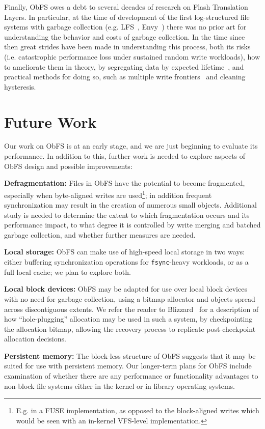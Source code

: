 \documentclass[sigconf,anonymous,10pt]{acmart}
\begin{document}
\begin{CCSXML}
Finally, ObFS owes a debt to several decades of research on Flash Translation Layers.
In particular, at the time of development of the first log-structured file systems with garbage collection (e.g. LFS~\cite{rosenblum_design_1991}, Envy~\cite{wu_envy_1994}) there was no prior art for understanding the behavior and costs of garbage collection.
In the time since then great strides have been made in understanding this process, both its risks (i.e. catastrophic performance loss under sustained random write workloads), how to ameliorate them in theory, by segregating data by expected lifetime~\cite{lee_last_2008}, and practical methods for doing so, such as multiple write frontiers~\cite{lee_f2fs_2015} and cleaning hysteresis.

\section{Future Work}
Our work on ObFS is at an early stage, and we are just beginning to evaluate its performance.
In addition to this, further work is needed to explore aspects of ObFS design and possible improvements:

\textbf{Defragmentation:} Files in ObFS have the potential to become  fragmented, especially when byte-aligned writes are used\footnote{E.g. in a FUSE implementation, as opposed to the block-aligned writes which would be seen with an in-kernel VFS-level implementation.}; in addition frequent synchronization may result in the creation of numerous small objects.
Additional study is needed to determine the extent to which fragmentation occurs and its performance impact, to what degree it is controlled by write merging and batched garbage collection, and whether further measures are needed.

\textbf{Local storage:} ObFS can make use of high-speed local storage in two ways: either buffering synchronization operations for \texttt{fsync}-heavy workloads, or as a full local cache; we plan to explore both.

\textbf{Local block devices:} ObFS may be adapted for use over local block devices with no need for garbage collection, using a bitmap allocator and objects spread across discontiguous extents.
We refer the reader to Blizzard~\cite{mickens_blizzard_2014} for a description of how ``hole-plugging'' allocation may be used in such a system, by checkpointing the allocation bitmap, allowing the recovery process to replicate post-checkpoint allocation decisions.

\textbf{Persistent memory:} The block-less structure of ObFS suggests that it may be suited for use with persistent memory.
Our longer-term plans for ObFS include examination of whether there are any performance or functionality advantages to non-block file systems either in the kernel or in library operating systems.


\end{CCSXML}
\end{document}

